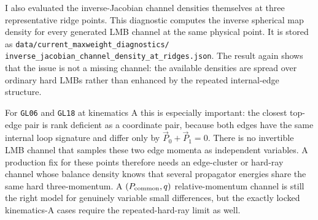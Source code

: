 \documentclass[11pt]{article}
\begin{document}
I also evaluated the inverse-Jacobian channel densities themselves at three
representative ridge points.  This diagnostic computes the inverse spherical
map density for every generated LMB channel at the same physical point.  It is
stored as
\texttt{data/current\_maxweight\_diagnostics/}
\texttt{inverse\_jacobian\_channel\_density\_at\_ridges.json}.  The result
again shows that the issue is not a missing channel: the available densities
are spread over ordinary hard LMBs rather than enhanced by the repeated
internal-edge structure.
\begin{center}
\scriptsize
{}
\end{center}
For \texttt{GL06} and \texttt{GL18} at kinematics A this is especially
important: the closest top-edge pair is rank deficient as a coordinate pair,
because both edges have the same internal loop signature and differ only by
\(\vec P_0+\vec P_1=0\).  There is no invertible LMB channel that samples
these two edge momenta as independent variables.  A production fix for these
points therefore needs an edge-cluster or hard-ray channel whose balance
density knows that several propagator energies share the same hard
three-momentum.  A \((P_{\rm common},q)\) relative-momentum channel is still
the right model for genuinely variable small differences, but the exactly
locked kinematics-A cases require the repeated-hard-ray limit as well.
\end{document}
